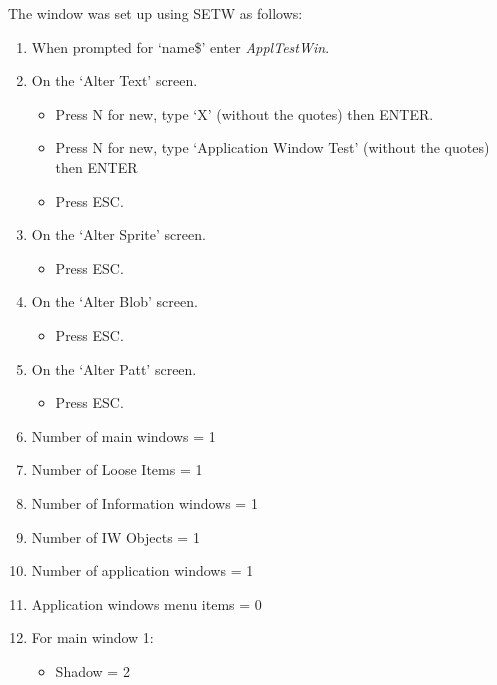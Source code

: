 The window was set up using SETW as
    follows:
\begin{enumerate}
\item{When prompted for `name\$' enter
 \emph{ApplTestWin}.
}
\item{On the `Alter Text' screen.
\begin{itemize}[itemsep=0pt]

\item{}Press N for new, type `X' (without the quotes) then
            ENTER.

\item{}Press N for new, type `Application Window Test' (without the
            quotes) then ENTER

\item{}Press ESC.

\end{itemize}
}
\item{On the `Alter Sprite' screen.
\begin{itemize}[itemsep=0pt]

\item{}Press ESC.

\end{itemize}
}
\item{On the `Alter Blob' screen.
\begin{itemize}[itemsep=0pt]

\item{}Press ESC.

\end{itemize}
}
\item{On the `Alter Patt' screen.
\begin{itemize}[itemsep=0pt]

\item{}Press ESC.

\end{itemize}
}
\item{Number of main windows = 1
}
\item{Number of Loose Items = 1
}
\item{Number of Information windows = 1
}
\item{Number of IW Objects = 1
}
\item{Number of application windows = 1
}
\item{Application windows menu items = 0
}
\item{For main window 1:
\begin{itemize}[itemsep=0pt]

\item{}Shadow = 2


\end{itemize}}
\end{enumerate}
